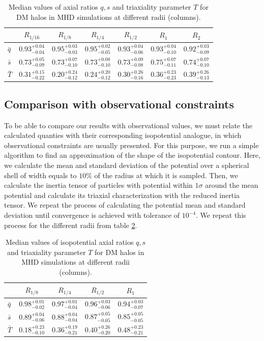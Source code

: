 \documentclass[a4paper,fleqn,usenatbib]{mnras}
\begin{document}
\begin{table}
\setlength{\tabcolsep}{3pt}
\begin{tabular}{l|cccccc}
 &$R_{1/16}$& $R_{1/8}$& $R_{1/4}$& $R_{1/2}$& $R_1$ & $R_2$\\
\hline \hline
$\bar{q}$&$0.93^{+0.04}_{-0.04}$&$0.95^{+0.03}_{-0.03}$&$0.95^{+0.02}_{-0.05}$&$0.93^{+0.04}_{-0.06}$&$0.93^{+0.04}_{-0.10}$&$0.92^{+0.03}_{-0.09}$ \\[0.1cm]
$\bar{s}$&$0.73^{+0.05}_{-0.09}$&$0.73^{+0.07}_{-0.10}$&$0.73^{+0.08}_{-0.10}$&$0.73^{+0.09}_{-0.08}$&$0.75^{+0.07}_{-0.11}$&$0.74^{+0.07}_{-0.10}$ \\[0.1cm]
$\bar{T}$&$0.31^{+0.15}_{-0.22}$&$0.20^{+0.24}_{-0.12}$&$0.24^{+0.20}_{-0.12}$&$0.30^{+0.26}_{-0.16}$&$0.36^{+0.23}_{-0.23}$&$0.39^{+0.26}_{-0.13}$ \\[0.1cm]
\hline
\end{tabular}
\caption{Median values of axial ratios $q,s$ and triaxiality parameter $T$ for DM halos in MHD simulations at different radii (columns). }
\label{tabe:MHD table}
\end{table}

\subsection{Comparison with observational constraints}
To be able to compare our results with observational values, we must relate the calculated quanties with their corresponding isopotential analogue, in which observational constraints are usually presented. For this purpose, we run a simple algorithm to find an approximation of the shape of the isopotential contour. Here, we calculate the mean and standard deviation of the potential over a spherical shell of width equals to $10\%$ of the radius at which it is sampled. Then, we calculate the inertia tensor of particles with potential within $1\sigma$ around the mean potential and calculate its triaxial characterization with the reduced inertia tensor. We repeat the process of calculating the potential mean and standard deviation until convergence is achieved with tolerance of $10^{-4}$. We repeat this process for the different radii from table \ref{tabe:isopotential}. \\

\begin{table}
\setlength{\tabcolsep}{3pt}
\begin{tabular}{l|cccc}
 & $R_{1/8}$& $R_{1/4}$& $R_{1/2}$& $R_1$ \\
\hline \hline
$\bar{q}$&$0.98^{+0.01}_{-0.02}$&$0.97^{+0.01}_{-0.04}$&$0.96^{+0.03}_{-0.06}$&$0.94^{+0.03}_{-0.07}$ \\[0.1cm]
$\bar{s}$&$0.89^{+0.04}_{-0.06}$&$0.88^{+0.04}_{-0.04}$&$0.87^{+0.05}_{-0.05}$&$0.85^{+0.05}_{-0.05}$ \\[0.1cm]
$\bar{T}$&$0.18^{+0.23}_{-0.10}$&$0.36^{+0.19}_{-0.21}$&$0.40^{+0.26}_{-0.20}$&$0.48^{+0.23}_{-0.21}$ \\[0.1cm]
\hline
\end{tabular}
\caption{Median values of isopotential axial ratios $q,s$ and triaxiality parameter $T$ for DM halos in MHD simulations at different radii (columns). }
\label{tabe:isopotential}
\end{table}
\end{document}
